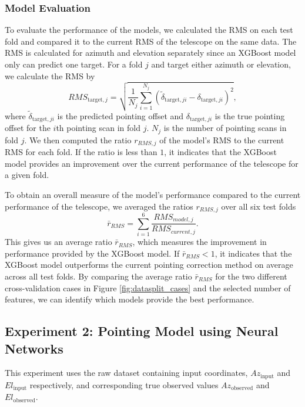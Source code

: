 \subsubsection{Model Evaluation}
To evaluate the performance of the models, we calculated the RMS on each test fold and compared it to the current RMS of the telescope on the same data.
The RMS is calculated for azimuth and elevation separately since an XGBoost model only can predict one target.
For a fold $j$ and target either azimuth or elevation, we calculate the RMS by
\begin{equation}
    RMS_{\text{target},j} = \sqrt{\frac{1}{N_j}\sum_{i=1}^{N_j} (\tilde{\delta}_{\text{target},ji} - \delta_{\text{target},ji})^2},
\end{equation}
where $\tilde{\delta}_{\text{target},ji}$ is the predicted pointing offset and $\delta_{\text{target},ji}$ is the true pointing offset for the $i$th pointing scan in fold $j$.
$N_j$ is the number of pointing scans in fold $j$. 
We then computed the ratio $r_{RMS,j}$ of the model's RMS to the current RMS for each fold.
If the ratio is less than $1$, it indicates that the XGBoost model provides an improvement over the current performance of the telescope for a given fold.

To obtain an overall measure of the model's performance compared to the current performance of the telescope, we averaged the ratios $r_{RMS,j}$ over all six test folds
\begin{equation} \label{eq:mean_rms_compared}
    \bar{r}_{RMS} = \sum_{i=1}^6 \frac{RMS_{model,j}}{RMS_{current,j}}.
\end{equation}
This gives us an average ratio $\bar{r}_{RMS}$, which measures the improvement in performance provided by the XGBoost model.
If $\bar{r}_{RMS} < 1$, it indicates that the XGBoost model outperforms the current pointing correction method on average across all test folds.
By comparing the average ratio $\bar{r}_{RMS}$ for the two different cross-validation cases in Figure \ref{fig:datasplit_cases} and the selected number of features,
we can identify which models provide the best performance.



\subsection{Experiment 2: Pointing Model using Neural Networks}
This experiment uses the raw dataset containing input coordinates, $Az_{\text{input}}$ and $El_{\text{input}}$ respectively, and corresponding true observed values $Az_{\text{observed}}$ and $El_{\text{observed}}$.

